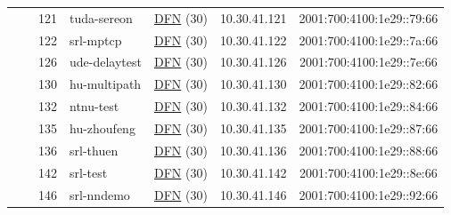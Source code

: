 \begin{small}
\begin{center}
\begin{longtable}{|c|c|c|c|c|c|c|c|}
  &  & \tiny{121} & \multicolumn{1}{|l|}{\tiny{tuda-sereon}} & \multicolumn{2}{|c|}{\tiny{\href{https://www.dfn.de}{DFN} (30)}} & \tiny{10.30.41.121} & \tiny{2001:700:4100:1e29::79:66} \\* \cline{3-3}\cline{4-4}\cline{5-5}\cline{6-6}\cline{7-7}\cline{8-8}
  &  & \tiny{122} & \multicolumn{1}{|l|}{\tiny{srl-mptcp}} & \multicolumn{2}{|c|}{\tiny{\href{https://www.dfn.de}{DFN} (30)}} & \tiny{10.30.41.122} & \tiny{2001:700:4100:1e29::7a:66} \\* \cline{3-3}\cline{4-4}\cline{5-5}\cline{6-6}\cline{7-7}\cline{8-8}
  &  & \tiny{126} & \multicolumn{1}{|l|}{\tiny{ude-delaytest}} & \multicolumn{2}{|c|}{\tiny{\href{https://www.dfn.de}{DFN} (30)}} & \tiny{10.30.41.126} & \tiny{2001:700:4100:1e29::7e:66} \\* \cline{3-3}\cline{4-4}\cline{5-5}\cline{6-6}\cline{7-7}\cline{8-8}
  &  & \tiny{130} & \multicolumn{1}{|l|}{\tiny{hu-multipath}} & \multicolumn{2}{|c|}{\tiny{\href{https://www.dfn.de}{DFN} (30)}} & \tiny{10.30.41.130} & \tiny{2001:700:4100:1e29::82:66} \\* \cline{3-3}\cline{4-4}\cline{5-5}\cline{6-6}\cline{7-7}\cline{8-8}
  &  & \tiny{132} & \multicolumn{1}{|l|}{\tiny{ntnu-test}} & \multicolumn{2}{|c|}{\tiny{\href{https://www.dfn.de}{DFN} (30)}} & \tiny{10.30.41.132} & \tiny{2001:700:4100:1e29::84:66} \\* \cline{3-3}\cline{4-4}\cline{5-5}\cline{6-6}\cline{7-7}\cline{8-8}
  &  & \tiny{135} & \multicolumn{1}{|l|}{\tiny{hu-zhoufeng}} & \multicolumn{2}{|c|}{\tiny{\href{https://www.dfn.de}{DFN} (30)}} & \tiny{10.30.41.135} & \tiny{2001:700:4100:1e29::87:66} \\* \cline{3-3}\cline{4-4}\cline{5-5}\cline{6-6}\cline{7-7}\cline{8-8}
  &  & \tiny{136} & \multicolumn{1}{|l|}{\tiny{srl-thuen}} & \multicolumn{2}{|c|}{\tiny{\href{https://www.dfn.de}{DFN} (30)}} & \tiny{10.30.41.136} & \tiny{2001:700:4100:1e29::88:66} \\* \cline{3-3}\cline{4-4}\cline{5-5}\cline{6-6}\cline{7-7}\cline{8-8}
  &  & \tiny{142} & \multicolumn{1}{|l|}{\tiny{srl-test}} & \multicolumn{2}{|c|}{\tiny{\href{https://www.dfn.de}{DFN} (30)}} & \tiny{10.30.41.142} & \tiny{2001:700:4100:1e29::8e:66} \\* \cline{3-3}\cline{4-4}\cline{5-5}\cline{6-6}\cline{7-7}\cline{8-8}
  &  & \tiny{146} & \multicolumn{1}{|l|}{\tiny{srl-nndemo}} & \multicolumn{2}{|c|}{\tiny{\href{https://www.dfn.de}{DFN} (30)}} & \tiny{10.30.41.146} & \tiny{2001:700:4100:1e29::92:66} \\* \cline{3-3}\cline{4-4}\cline{5-5}\cline{6-6}\cline{7-7}\cline{8-8}

\end{longtable}
\end{center}
\end{small}
